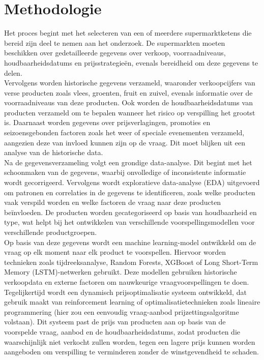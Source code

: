 \section{Methodologie}%
\label{sec:methodologie}
Het proces begint met het selecteren van een of meerdere supermarktketens die bereid zijn deel te nemen aan het onderzoek.
De supermarkten moeten beschikken over gedetailleerde gegevens over verkoop, voorraadniveaus, houdbaarheidsdatums en prijsstrategieën,
evenals bereidheid om deze gegevens te delen.
\\
Vervolgens worden historische gegevens verzameld,
waaronder verkoopcijfers van verse producten zoals vlees, groenten, fruit en zuivel,
evenals informatie over de voorraadniveaus van deze producten.
Ook worden de houdbaarheidsdatums van producten verzameld om te bepalen wanneer het risico op verspilling het grootst is.
Daarnaast worden gegevens over prijsverlagingen, promoties en seizoensgebonden factoren zoals het weer of speciale evenementen verzameld,
aangezien deze van invloed kunnen zijn op de vraag.
Dit moet blijken uit een analyse van de historische data.
\\
Na de gegevensverzameling volgt een grondige data-analyse.
Dit begint met het schoonmaken van de gegevens, waarbij onvolledige of inconsistente informatie wordt gecorrigeerd.
Vervolgens wordt exploratieve data-analyse (EDA) uitgevoerd om patronen en correlaties in de gegevens te identificeren,
zoals welke producten vaak verspild worden en welke factoren de vraag naar deze producten beïnvloeden.
De producten worden gecategoriseerd op basis van houdbaarheid en type, wat helpt bij het ontwikkelen van verschillende voorspellingsmodellen voor verschillende productgroepen.
\\
Op basis van deze gegevens wordt een machine learning-model ontwikkeld om de vraag op elk moment naar elk product te voorspellen.
Hiervoor worden technieken zoals tijdreeksanalyse, Random Forests, XGBoost of Long Short-Term Memory (LSTM)-netwerken gebruikt.
Deze modellen gebruiken historische verkoopdata en externe factoren om nauwkeurige vraagvoorspellingen te doen.
Tegelijkertijd wordt een dynamisch prijsoptimalisatie systeem ontwikkeld, dat gebruik maakt van reinforcement learning of optimalisatietechnieken zoals lineaire programmering (hier zou een eenvoudig vraag-aanbod prijzettingsalgoritme volstaan).
Dit systeem past de prijs van producten aan op basis van de voorspelde vraag, aanbod en de houdbaarheidsdatums,
zodat producten die waarschijnlijk niet verkocht zullen worden, tegen een lagere prijs kunnen worden aangeboden om verspilling te verminderen zonder de winstgevendheid te schaden.

